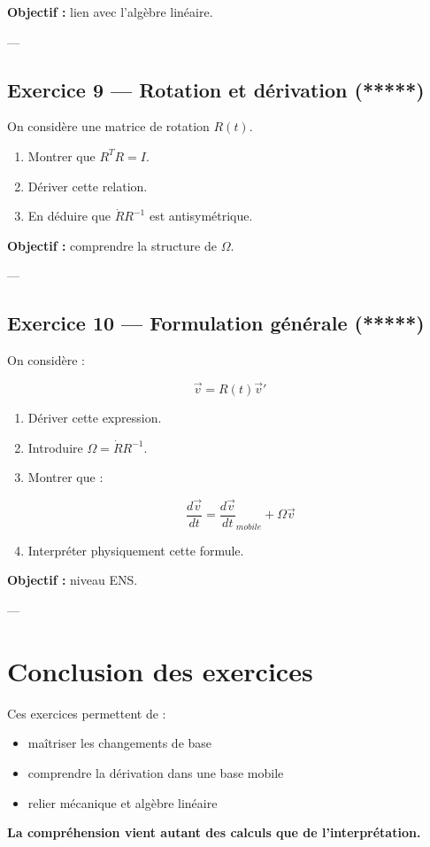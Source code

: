 \documentclass[11pt,a4paper]{article}
\begin{document}
\textbf{Objectif :} lien avec l’algèbre linéaire.

---

\subsection*{Exercice 9 — Rotation et dérivation (*****)}

On considère une matrice de rotation $R(t)$.

\begin{enumerate}
\item Montrer que $R^T R = I$.
\item Dériver cette relation.
\item En déduire que $\dot{R}R^{-1}$ est antisymétrique.
\end{enumerate}

\textbf{Objectif :} comprendre la structure de $\Omega$.

---

\subsection*{Exercice 10 — Formulation générale (*****)}

On considère :

\[
\vec{v} = R(t)\vec{v}'
\]

\begin{enumerate}
\item Dériver cette expression.
\item Introduire $\Omega = \dot{R}R^{-1}$.
\item Montrer que :

\[
\frac{d\vec{v}}{dt} =
\frac{d\vec{v}}{dt}_{mobile} + \Omega \vec{v}
\]

\item Interpréter physiquement cette formule.
\end{enumerate}

\textbf{Objectif :} niveau ENS.

---

\section{Conclusion des exercices}

Ces exercices permettent de :

\begin{itemize}
\item maîtriser les changements de base
\item comprendre la dérivation dans une base mobile
\item relier mécanique et algèbre linéaire
\end{itemize}

\bigskip

\begin{center}
\textbf{La compréhension vient autant des calculs que de l’interprétation.}
\end{center}
\end{document}
